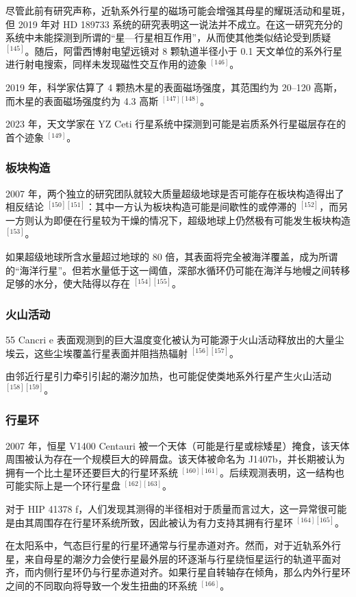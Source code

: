 尽管此前有研究声称，近轨系外行星的磁场可能会增强其母星的耀斑活动和星斑，但 2019 年对 HD 189733 系统的研究表明这一说法并不成立。在这一研究充分的系统中未能探测到所谓的“星—行星相互作用”，从而使其他类似结论受到质疑 $^{[145]}$。随后，阿雷西博射电望远镜对 8 颗轨道半径小于 0.1 天文单位的系外行星进行射电搜索，同样未发现磁性交互作用的迹象 $^{[146]}$。

2019 年，科学家估算了 4 颗热木星的表面磁场强度，其范围约为 20–120 高斯，而木星的表面磁场强度约为 4.3 高斯 $^{[147][148]}$。

2023 年，天文学家在 YZ Ceti 行星系统中探测到可能是岩质系外行星磁层存在的首个迹象 $^{[149]}$。
\subsubsection{板块构造}
2007 年，两个独立的研究团队就较大质量超级地球是否可能存在板块构造得出了相反结论 $^{[150][151]}$：其中一方认为板块构造可能是间歇性的或停滞的 $^{[152]}$，而另一方则认为即便在行星较为干燥的情况下，超级地球上仍然极有可能发生板块构造 $^{[153]}$。

如果超级地球所含水量超过地球的 80 倍，其表面将完全被海洋覆盖，成为所谓的“海洋行星”。但若水量低于这一阈值，深部水循环仍可能在海洋与地幔之间转移足够的水分，使大陆得以存在 $^{[154][155]}$。
\subsubsection{火山活动}
55 Cancri e 表面观测到的巨大温度变化被认为可能源于火山活动释放出的大量尘埃云，这些尘埃覆盖行星表面并阻挡热辐射 $^{[156][157]}$。

由邻近行星引力牵引引起的潮汐加热，也可能促使类地系外行星产生火山活动 $^{[158][159]}$。
\subsubsection{行星环}
2007 年，恒星 V1400 Centauri 被一个天体（可能是行星或棕矮星）掩食，该天体周围被认为存在一个规模巨大的碎屑盘。该天体被命名为 J1407b，并长期被认为拥有一个比土星环还要巨大的行星环系统 $^{[160][161]}$。后续观测表明，这一结构也可能实际上是一个环行星盘 $^{[162][163]}$。

对于 HIP 41378 f，人们发现其测得的半径相对于质量而言过大，这一异常很可能是由其周围存在行星环系统所致，因此被认为有力支持其拥有行星环 $^{[164][165]}$。

在太阳系中，气态巨行星的行星环通常与行星赤道对齐。然而，对于近轨系外行星，来自母星的潮汐力会使行星最外层的环逐渐与行星绕恒星运行的轨道平面对齐，而内侧行星环仍与行星赤道对齐。如果行星自转轴存在倾角，那么内外行星环之间的不同取向将导致一个发生扭曲的环系统 $^{[166]}$。
